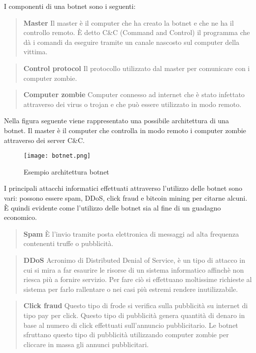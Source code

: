 \documentclass[../main.tex]{subfiles}
\begin{document}
I componenti di una botnet sono i seguenti:

\begin{verse}
				\textbf{Master} Il master è il computer che ha creato la botnet e che ne ha il controllo remoto. È detto C\&C (Command and Control) il programma che dà i comandi da eseguire tramite un canale nascosto sul computer della vittima.
\end{verse}

\begin{verse}
				\textbf{Control protocol} Il protocollo utilizzato dal master per comunicare con i computer zombie.
\end{verse}

\begin{verse}
				\textbf{Computer zombie} Computer connesso ad internet che è stato infettato attraverso dei virus o trojan e che può essere utilizzato in modo remoto. 
\end{verse}

Nella figura seguente viene rappresentato una possibile architettura di una botnet. Il master è il computer che controlla in modo remoto i computer zombie attraverso dei server C\&C.
\begin{figure}[H]
				\centering
				\texttt{[image: botnet.png]}
				\caption{Esempio architettura botnet}
\end{figure}

I principali attacchi informatici effettuati attraverso l'utilizzo delle botnet sono vari: possono essere spam, DDoS, click fraud e bitcoin mining per citarne alcuni. È quindi evidente come l'utilizzo delle botnet sia al fine di un guadagno economico.

\begin{verse}
				\textbf{Spam} È l'invio tramite posta elettronica di messaggi ad alta frequenza contenenti truffe o pubblicità.
\end{verse}

\begin{verse}
				\textbf{DDoS} Acronimo di Distributed Denial of Service, è un tipo di attacco in cui si mira a far esaurire le risorse di un sistema informatico affinchè non riesca più a fornire servizio. Per fare ciò si effettuano moltissime richieste al sistema per farlo rallentare o nei casi più estremi rendere inutilizzabile.
\end{verse}

\begin{verse}
				\textbf{Click fraud} Questo tipo di frode si verifica sulla pubblicità su internet di tipo pay per click. Questo tipo di pubblicità genera quantità di denaro in base al numero di click effettuati sull'annuncio pubblicitario. Le botnet sfruttano questo tipo di pubblicità utilizzando computer zombie per cliccare in massa gli annunci pubblicitari.
\end{verse}
\end{document}
